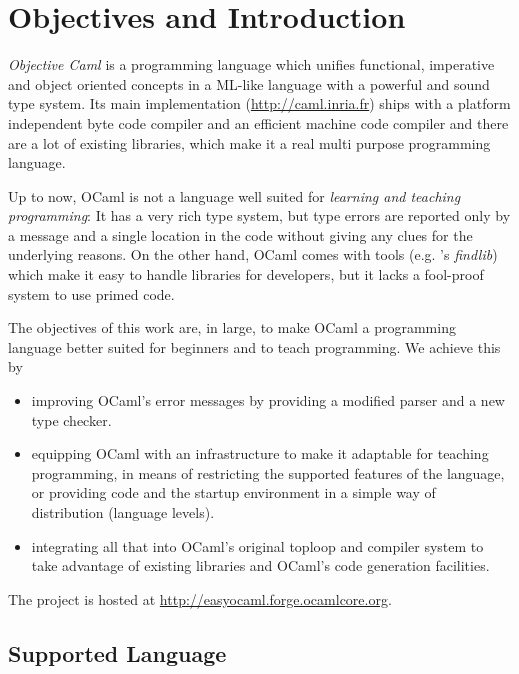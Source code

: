 
\section{Objectives and Introduction}
\label{hd001}
\emph{Objective Caml} \citep{leroy2008} is a programming language which unifies 
functional, imperative and object oriented concepts in a ML-like 
language with a powerful and sound type system.  Its main implementation 
(\href{http://caml.inria.fr}{http://caml.inria.fr}) ships 
with a platform independent byte code compiler and an efficient machine 
code compiler and there are a lot of existing libraries, which make it a 
real multi purpose programming language.

Up to now, OCaml is not a language well suited for \emph{learning and teaching
programming}: It has a very rich type system, but type errors are reported only
by a message and a single location in the code without giving any clues for the
underlying reasons. On the other hand, OCaml comes with tools (e.g.
\citeauthor{stolpmann}'s \emph{findlib}) which make it easy to handle libraries
for developers, but it lacks a fool-proof system to use primed code.

The objectives of this work are, in large, to make OCaml a
programming language better suited for beginners and to teach programming. We
achieve this by

\begin{itemize}
    \item improving OCaml's error messages by providing a modified 
        parser and a new type checker.
    \item equipping OCaml with an infrastructure to make it 
        adaptable for teaching programming, in means of restricting the 
        supported features of the language, or providing code and the 
        startup environment in a simple way of distribution (language 
        levels).
    \item integrating all that into OCaml's original toploop and 
        compiler system to take advantage of existing libraries and 
        OCaml's code generation facilities.
\end{itemize}
The project is hosted at
\href{http://easyocaml.forge.ocamlcore.org}{http://easyocaml.forge.ocamlcore.org}.

\subsection{Supported Language}

